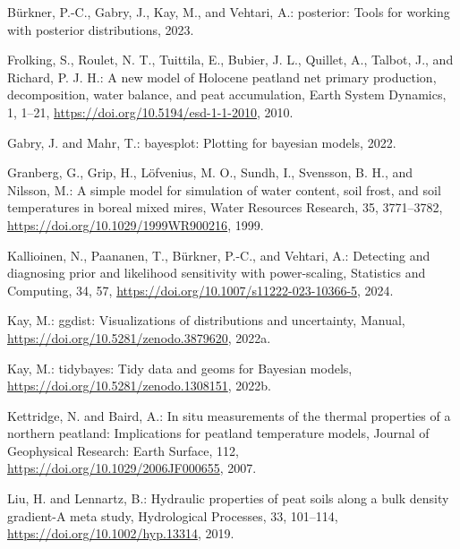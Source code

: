 \documentclass[
  12pt,
]{article}
\newlength{\cslhangindent}
\newlength{\cslentryspacingunit} %
\newenvironment{CSLReferences}[2] %
 {%
  \setlength{\parindent}{0pt}
  \ifodd #1
  \let\oldpar\par
  \def\par{\hangindent=\cslhangindent\oldpar}
  \fi
  \setlength{\parskip}{#2\cslentryspacingunit}
 }%
 {}
\begin{document}
\hypertarget{refs}{}
\begin{CSLReferences}{0}{0}
\leavevmode{}%
Bürkner, P.-C., Gabry, J., Kay, M., and Vehtari, A.: {posterior}: {Tools} for working with posterior distributions, 2023.

\leavevmode{}%
Frolking, S., Roulet, N. T., Tuittila, E., Bubier, J. L., Quillet, A., Talbot, J., and Richard, P. J. H.: A new model of {Holocene} peatland net primary production, decomposition, water balance, and peat accumulation, Earth System Dynamics, 1, 1--21, \url{https://doi.org/10.5194/esd-1-1-2010}, 2010.

\leavevmode{}%
Gabry, J. and Mahr, T.: {bayesplot}: {Plotting} for bayesian models, 2022.

\leavevmode{}%
Granberg, G., Grip, H., Löfvenius, M. O., Sundh, I., Svensson, B. H., and Nilsson, M.: A simple model for simulation of water content, soil frost, and soil temperatures in boreal mixed mires, Water Resources Research, 35, 3771--3782, \url{https://doi.org/10.1029/1999WR900216}, 1999.

\leavevmode{}%
Kallioinen, N., Paananen, T., Bürkner, P.-C., and Vehtari, A.: Detecting and diagnosing prior and likelihood sensitivity with power-scaling, Statistics and Computing, 34, 57, \url{https://doi.org/10.1007/s11222-023-10366-5}, 2024.

\leavevmode{}%
Kay, M.: {ggdist}: {Visualizations} of distributions and uncertainty, Manual, \url{https://doi.org/10.5281/zenodo.3879620}, 2022a.

\leavevmode{}%
Kay, M.: {tidybayes}: {Tidy} data and geoms for {Bayesian} models, \url{https://doi.org/10.5281/zenodo.1308151}, 2022b.

\leavevmode{}%
Kettridge, N. and Baird, A.: In situ measurements of the thermal properties of a northern peatland: {Implications} for peatland temperature models, Journal of Geophysical Research: Earth Surface, 112, \url{https://doi.org/10.1029/2006JF000655}, 2007.

\leavevmode{}%
Liu, H. and Lennartz, B.: Hydraulic properties of peat soils along a bulk density gradient-{A} meta study, Hydrological Processes, 33, 101--114, \url{https://doi.org/10.1002/hyp.13314}, 2019.


\end{CSLReferences}
\end{document}
